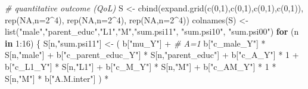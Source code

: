 \documentclass[
]{book}
\newenvironment{Shaded}{\begin{snugshade}}{\end{snugshade}}
\newcommand{\AttributeTok}[1]{\textcolor[rgb]{0.77,0.63,0.00}{#1}}
\newcommand{\CommentTok}[1]{\textcolor[rgb]{0.56,0.35,0.01}{\textit{#1}}}
\newcommand{\ConstantTok}[1]{\textcolor[rgb]{0.00,0.00,0.00}{#1}}
\newcommand{\ControlFlowTok}[1]{\textcolor[rgb]{0.13,0.29,0.53}{\textbf{#1}}}
\newcommand{\DecValTok}[1]{\textcolor[rgb]{0.00,0.00,0.81}{#1}}
\newcommand{\FunctionTok}[1]{\textcolor[rgb]{0.00,0.00,0.00}{#1}}
\newcommand{\NormalTok}[1]{#1}
\newcommand{\OtherTok}[1]{\textcolor[rgb]{0.56,0.35,0.01}{#1}}
\newcommand{\SpecialCharTok}[1]{\textcolor[rgb]{0.00,0.00,0.00}{#1}}
\newcommand{\StringTok}[1]{\textcolor[rgb]{0.31,0.60,0.02}{#1}}
\begin{document}
\begin{Shaded}
\begin{Highlighting}[]
  \CommentTok{\# quantitative outcome (QoL)}
\NormalTok{  S }\OtherTok{\textless{}{-}} \FunctionTok{cbind}\NormalTok{(}\FunctionTok{expand.grid}\NormalTok{(}\FunctionTok{c}\NormalTok{(}\DecValTok{0}\NormalTok{,}\DecValTok{1}\NormalTok{),}\FunctionTok{c}\NormalTok{(}\DecValTok{0}\NormalTok{,}\DecValTok{1}\NormalTok{),}\FunctionTok{c}\NormalTok{(}\DecValTok{0}\NormalTok{,}\DecValTok{1}\NormalTok{),}\FunctionTok{c}\NormalTok{(}\DecValTok{0}\NormalTok{,}\DecValTok{1}\NormalTok{)), }\FunctionTok{rep}\NormalTok{(}\ConstantTok{NA}\NormalTok{,}\AttributeTok{n=}\DecValTok{2}\SpecialCharTok{\^{}}\DecValTok{4}\NormalTok{), }
             \FunctionTok{rep}\NormalTok{(}\ConstantTok{NA}\NormalTok{,}\AttributeTok{n=}\DecValTok{2}\SpecialCharTok{\^{}}\DecValTok{4}\NormalTok{), }\FunctionTok{rep}\NormalTok{(}\ConstantTok{NA}\NormalTok{,}\AttributeTok{n=}\DecValTok{2}\SpecialCharTok{\^{}}\DecValTok{4}\NormalTok{))}
  \FunctionTok{colnames}\NormalTok{(S) }\OtherTok{\textless{}{-}} \FunctionTok{list}\NormalTok{(}\StringTok{"male"}\NormalTok{,}\StringTok{"parent\_educ"}\NormalTok{,}\StringTok{"L1"}\NormalTok{,}\StringTok{"M"}\NormalTok{,}\StringTok{"sum.psi11"}\NormalTok{, }\StringTok{"sum.psi10"}\NormalTok{, }
                      \StringTok{"sum.psi00"}\NormalTok{)}
  \ControlFlowTok{for}\NormalTok{ (n }\ControlFlowTok{in} \DecValTok{1}\SpecialCharTok{:}\DecValTok{16}\NormalTok{) \{}
\NormalTok{    S[n,}\StringTok{"sum.psi11"}\NormalTok{] }\OtherTok{\textless{}{-}}\NormalTok{  ( b[}\StringTok{"mu\_Y"}\NormalTok{] }\SpecialCharTok{+}                                          \CommentTok{\# A=1}
\NormalTok{                             b[}\StringTok{"c\_male\_Y"}\NormalTok{] }\SpecialCharTok{*}\NormalTok{ S[n,}\StringTok{"male"}\NormalTok{] }\SpecialCharTok{+} 
\NormalTok{                             b[}\StringTok{"c\_parent\_educ\_Y"}\NormalTok{] }\SpecialCharTok{*}\NormalTok{ S[n,}\StringTok{"parent\_educ"}\NormalTok{] }\SpecialCharTok{+} 
\NormalTok{                             b[}\StringTok{"c\_A\_Y"}\NormalTok{] }\SpecialCharTok{*} \DecValTok{1} \SpecialCharTok{+} 
\NormalTok{                             b[}\StringTok{"c\_L1\_Y"}\NormalTok{] }\SpecialCharTok{*}\NormalTok{ S[n,}\StringTok{"L1"}\NormalTok{] }\SpecialCharTok{+}
\NormalTok{                             b[}\StringTok{"c\_M\_Y"}\NormalTok{] }\SpecialCharTok{*}\NormalTok{ S[n,}\StringTok{"M"}\NormalTok{] }\SpecialCharTok{+}
\NormalTok{                             b[}\StringTok{"c\_AM\_Y"}\NormalTok{] }\SpecialCharTok{*} \DecValTok{1} \SpecialCharTok{*}\NormalTok{ S[n,}\StringTok{"M"}\NormalTok{] }\SpecialCharTok{*}\NormalTok{ b[}\StringTok{"A.M.inter"}\NormalTok{] ) }\SpecialCharTok{*}

\end{Highlighting}
\end{Shaded}
\end{document}
